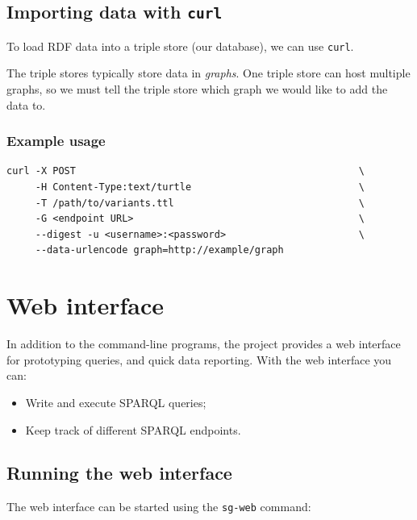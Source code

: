 \documentclass[11pt,a4paper,oneside]{book}
\begin{document}
\section{Importing data with \texttt{curl}}
\label{sec:curl}

  To load RDF data into a triple store (our database), we can use \texttt{curl}.

  The triple stores typically store data in \emph{graphs}.  One triple store
  can host multiple graphs, so we must tell the triple store which graph we
  would like to add the data to.

\subsection{Example usage}

\begin{siderules}
\begin{verbatim}
curl -X POST                                                 \
     -H Content-Type:text/turtle                             \
     -T /path/to/variants.ttl                                \
     -G <endpoint URL>                                       \
     --digest -u <username>:<password>                       \
     --data-urlencode graph=http://example/graph
\end{verbatim}
\end{siderules}

\chapter{Web interface}
\label{chap:web-interface}

  In addition to the command-line programs, the project provides a web
  interface for prototyping queries, and quick data reporting.  With the
  web interface you can:
  \begin{itemize}
  \item Write and execute SPARQL queries;
  \item Keep track of different SPARQL endpoints.
  \end{itemize}

\section{Running the web interface}

  The web interface can be started using the \texttt{sg-web} command:
\end{document}
